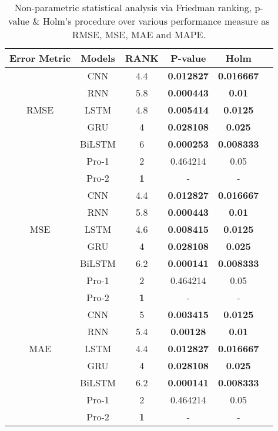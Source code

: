 \begin{table}[htbp]
\centering
    \setlength{\tabcolsep}{3pt}
 {\renewcommand{\arraystretch}{1}%
    \caption{Non-parametric statistical analysis via Friedman ranking,  p-value \& Holm's procedure over various performance measure as RMSE,  MSE,  MAE and MAPE.}
    \begin{tabular}{cccccc}
        \toprule
        Error Metric & Models & RANK & P-value & Holm \\
        \midrule
        \multirow{5}{*}{RMSE} & CNN & 4.4 & \textbf{0.012827} & \textbf{0.016667} \\
        & RNN & 5.8 & \textbf{0.000443} & \textbf{0.01} \\
        & LSTM & 4.8 & \textbf{0.005414} & \textbf{0.0125} \\
        & GRU & 4 & \textbf{0.028108} & \textbf{0.025} \\
        & BiLSTM & 6 & \textbf{0.000253} & \textbf{0.008333} \\
        & Pro-1 & 2  & 0.464214 & 0.05\\
        & Pro-2 & \textbf{1}  & - & -\\
        \midrule
        \multirow{5}{*}{MSE} & CNN & 4.4 & \textbf{0.012827} & \textbf{0.016667} \\
        & RNN & 5.8 & \textbf{0.000443} & \textbf{0.01} \\
        & LSTM & 4.6 & \textbf{0.008415} & \textbf{0.0125} \\
        & GRU & 4 & \textbf{0.028108} & \textbf{0.025} \\
        & BiLSTM & 6.2 & \textbf{0.000141} & \textbf{0.008333} \\
        & Pro-1 & 2 & 0.464214 & 0.05 \\
        & Pro-2 & \textbf{1}  & - & -\\
        \midrule
        \multirow{5}{*}{MAE} & CNN & 5 & \textbf{0.003415} & \textbf{0.0125} \\
        & RNN & 5.4 & \textbf{0.00128} & \textbf{0.01} \\
        & LSTM & 4.4 & \textbf{0.012827} & \textbf{0.016667} \\
        & GRU & 4 & \textbf{0.028108} & \textbf{0.025} \\
        & BiLSTM & 6.2 & \textbf{0.000141} & \textbf{0.008333} \\
        & Pro-1 & 2 & 0.464214 & 0.05 \\
        & Pro-2 & \textbf{1}  & - & -\\

\end{tabular}}
\end{table}
